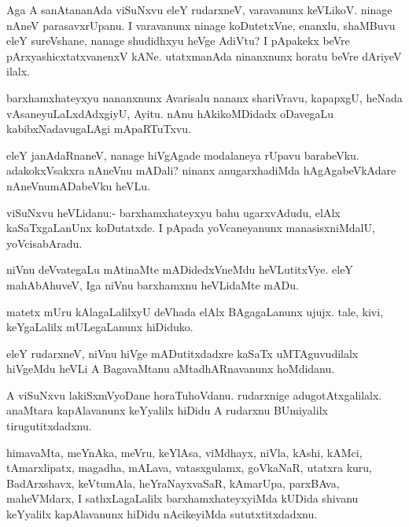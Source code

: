 \documentclass{article}
\begin{document}
\begin{mn}
Aga A sanAtananAda viSuNxvu eleY rudarxneV, varavanunx
keVLikoV. ninage nAneV parasavxrUpanu. I varavanunx ninage
koDutetxVne, enanxlu, shaMBuvu eleY sureVshane, nanage shudidhxyu
heVge AdiVtu? I pApakekx beVre pArxyashicxtatxvanenxV
kANe. utatxmanAda ninanxnunx horatu beVre dAriyeV ilalx.
\end{mn}

\begin{mn}%
barxhamxhateyxyu nananxnunx Avarisalu nananx shariVravu, kapapxgU,
heNada vAsaneyuLaLxdAdxgiyU, Ayitu. nAnu hAkikoMDidadx oDavegaLu
kabibxNadavugaLAgi mApaRTuTxvu.
\end{mn}

\begin{mn}
eleY janAdaRnaneV, nanage hiVgAgade modalaneya rUpavu
barabeVku. adakokxVsakxra nAneVnu mADali? ninanx anugarxhadiMda
hAgAgabeVkAdare nAneVnumADabeVku heVLu.
\end{mn}

\begin{mn}
viSuNxvu heVLidanu:- barxhamxhateyxyu bahu ugarxvAdudu, elAlx
kaSaTxgaLanUnx koDutatxde. I pApada yoVcaneyanunx manasisxniMdalU, yoVcisabAradu.
\end{mn}

\begin{mn}
niVnu deVvategaLu mAtinaMte mADidedxVneMdu heVLutitxVye. eleY
mahAbAhuveV, Iga niVnu barxhamxnu heVLidaMte mADu.
\end{mn}

\begin{mn}
matetx mUru kAlagaLalilxyU deVhada elAlx BAgagaLanunx ujujx. tale,
kivi, keYgaLalilx mULegaLanunx hiDiduko.
\end{mn}

\begin{mn}%
eleY rudarxneV, niVnu hiVge mADutitxdadxre kaSaTx uMTAguvudilalx
hiVgeMdu heVLi A BagavaMtanu aMtadhARnavanunx hoMdidanu.
\end{mn}

\begin{mn}%
A viSuNxvu lakiSxmVyoDane horaTuhoVdanu. rudarxnige
adugotAtxgalilalx. anaMtara kapAlavanunx keYyalilx hiDidu A rudarxnu
BUmiyalilx tirugutitxdadxnu.
\end{mn}

\begin{mn}%
himavaMta, meYnAka, meVru, keYlAsa, viMdhayx, niVla, kAshi, kAMci,
tAmarxlipatx, magadha, mALava, vatasxgulamx, goVkaNaR, utatxra kuru,
BadArxshavx, keVtumAla, heYraNayxvaSaR, kAmarUpa, parxBAva,
maheVMdarx, I sathxLagaLalilx barxhamxhateyxyiMda kUDida shivanu
keYyalilx kapAlavanunx hiDidu nAcikeyiMda sututxtitxdadxnu.
\end{mn}
\end{document}
